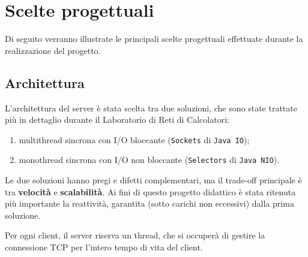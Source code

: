 \section{Scelte progettuali}
Di seguito verranno illustrate le principali scelte progettuali effettuate durante la realizzazione del progetto.

\subsection{Architettura}
\sloppy
L'architettura del server è stata scelta tra due soluzioni, che sono state trattate più in dettaglio durante il Laboratorio di Reti di Calcolatori:

\begin{enumerate}
	\item multithread sincrona con I/O bloccante (\texttt{Sockets} di \texttt{Java IO});
	\item monothread sincrona con I/O non bloccante (\texttt{Selectors} di \texttt{Java NIO}).
\end{enumerate}

Le due soluzioni hanno pregi e difetti complementari, ma il trade-off principale è tra \textbf{velocità} e \textbf{scalabilità}. Ai fini di questo progetto didattico è stata ritenuta più importante la reattività, garantita (sotto carichi non eccessivi) dalla prima soluzione.

\medskip

Per ogni client, il server riserva un thread, che si occuperà di gestire la connessione TCP per l'intero tempo di vita del client.
